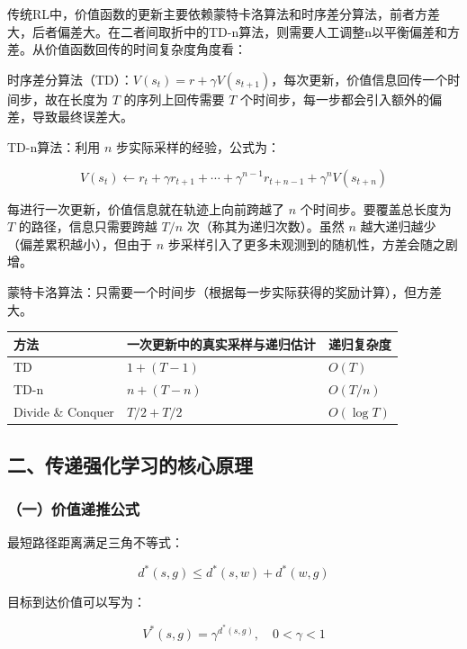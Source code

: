 传统RL中，价值函数的更新主要依赖蒙特卡洛算法和时序差分算法，前者方差大，后者偏差大。在二者间取折中的TD-n算法，则需要人工调整n以平衡偏差和方差。从价值函数回传的时间复杂度角度看：

时序差分算法（TD）：\(V(s_t)=r+\gamma V(s_{t+1})\)，每次更新，价值信息回传一个时间步，故在长度为 \(T\) 的序列上回传需要 \(T\) 个时间步，每一步都会引入额外的偏差，导致最终误差大。

TD-n算法：利用 \(n\) 步实际采样的经验，公式为：

\[
V(s_t) \leftarrow r_t+\gamma r_{t+1}+\cdots+\gamma^{n-1}r_{t+n-1}+\gamma^{n} V(s_{t+n})
\]

每进行一次更新，价值信息就在轨迹上向前跨越了 \(n\) 个时间步。要覆盖总长度为 \(T\) 的路径，信息只需要跨越 \(T/n\) 次（称其为递归次数）。虽然 \(n\) 越大递归越少（偏差累积越小），但由于 \(n\) 步采样引入了更多未观测到的随机性，方差会随之剧增。

蒙特卡洛算法：只需要一个时间步（根据每一步实际获得的奖励计算），但方差大。

\begin{longtable}[]{@{}lll@{}}
\toprule
方法 & 一次更新中的真实采样与递归估计 & 递归复杂度 \\
\midrule
\endhead
TD & \(1+(T-1)\) & \(O(T)\) \\
TD-n & \(n+(T-n)\) & \(O(T/n)\) \\
Divide \& Conquer & \(T/2+T/2\) & \(O(\log T)\) \\
\bottomrule
\end{longtable}

\hypertarget{ux4e8cux4f20ux9012ux5f3aux5316ux5b66ux4e60ux7684ux6838ux5fc3ux539fux7406}{%
\subsection{二、传递强化学习的核心原理}\label{ux4e8cux4f20ux9012ux5f3aux5316ux5b66ux4e60ux7684ux6838ux5fc3ux539fux7406}}

\hypertarget{ux4e00ux4ef7ux503cux9012ux63a8ux516cux5f0f}{%
\subsubsection{（一）价值递推公式}\label{ux4e00ux4ef7ux503cux9012ux63a8ux516cux5f0f}}

最短路径距离满足三角不等式：

\[
d^{*}(s,g) \le d^{*}(s,w)+d^{*}(w,g)
\]

目标到达价值可以写为：

\[
V^{*}(s,g)=\gamma^{d^{*}(s,g)},\quad 0<\gamma<1
\]

